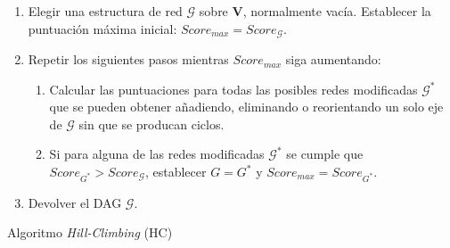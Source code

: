 \begin{algorithm}[H]
\label{alg1}
\SetAlgoLined
\medskip
\begin{enumerate}
    \item Elegir una estructura de red $\mathcal{G}$ sobre $\mathbf{V}$, normalmente vacía. Establecer la puntuación máxima inicial: $Score_{max} = Score_{\mathcal{G}}$.
    \item Repetir los siguientes pasos mientras $Score_{max}$ siga aumentando:
    \begin{enumerate}
        \item Calcular las puntuaciones para todas las posibles redes modificadas $\mathcal{G}^{*}$ que se pueden obtener añadiendo, eliminando o reorientando un solo eje de $\mathcal{G}$ sin que se producan ciclos.
        \item Si para alguna de las redes modificadas $\mathcal{G}^{*}$ se cumple que $Score_{G^{*}} > Score_{\mathcal{G}}$, establecer $G = G^{*}$ y $Score_{max} = Score_{G^{*}}$.
    \end{enumerate}
    \item Devolver el DAG $\mathcal{G}$.
\end{enumerate}
 \caption{Algoritmo \textit{Hill-Climbing} (HC)}
\end{algorithm}
